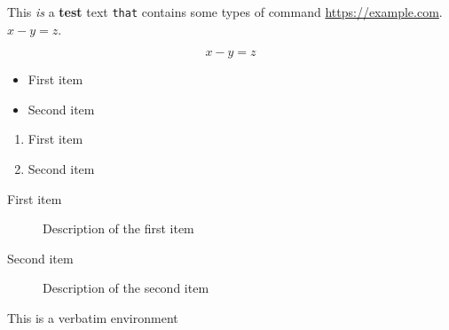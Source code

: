 This \textit{is} a \textbf{test} text \verb|that| contains some types of command \url{https://example.com}.
$ x - y = z $.

\begin{equation}
    x - y = z
\end{equation}

\begin{itemize}
    \item First item
    \item Second item
\end{itemize}

\begin{enumerate}
    \item First item
    \item Second item
\end{enumerate}

\begin{description}
    \item[First item] Description of the first item
    \item[Second item] Description of the second item
\end{description}

\begin{verbatime}
    This is a verbatim environment
\end{verbatime}
